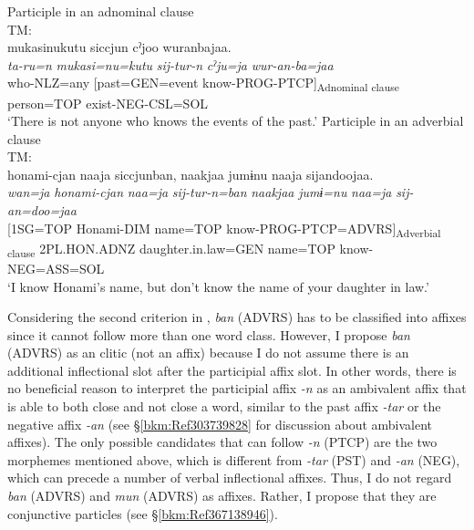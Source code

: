 \ea
\ea\label{ex:4.20a}Participle in an adnominal clause\hfill\relax[Co: 110328\_00.txt]\\
 {TM:} \\   {mukasinukutu}  {siccjun} {cˀjoo}  {wuranbajaa.}\\
   {\itshape ta-ru=n}  {\itshape mukasi=nu=kutu}  {\itshape sij-tur-n} {\itshape cˀju=ja}  {\itshape wur-an-ba=jaa}\\
   {who-NLZ=any}  {[past=GEN=event}  {know-PROG-PTCP]\textsubscript{Adnominal clause}} {person=TOP}  {exist-NEG-CSL=SOL}\\
   \glt ‘There is not anyone who knows the events of the past.’
\ex\label{ex:4.20b}Participle in an adverbial clause\hfill\relax[Co: 110328\_00.txt]\\
 {TM:} \\   {honami-{\textbar}cjan{\textbar}}  {naaja}  {siccjunban,} {naakjaa}  {jumɨnu}  {naaja}  {sijandoojaa.}\\
   {\itshape wan=ja}  {\textit{honami-cjan}}  {\itshape naa=ja}  {\itshape sij-tur-n=ban} {\itshape naakjaa}  {\itshape jumɨ=nu}  {\itshape naa=ja}  {\itshape sij-an=doo=jaa}\\
   {[1SG=TOP}  {Honami-DIM}  {name=TOP}  {know-PROG-PTCP=ADVRS]\textsubscript{Adverbial clause}} {2PL.HON.ADNZ}  {daughter.in.law=GEN}  {name=TOP}  {know-NEG=ASS=SOL}\\
   \glt ‘I know Honami’s name, but don’t know the name of your daughter in law.’\\
\z
\z

\noindent Considering the second criterion in , \textit{ban} (ADVRS) has to be classified into affixes since it cannot follow more than one word class. However, I propose \textit{ban} (ADVRS) as an clitic (not an affix) because I do not assume there is an additional inflectional slot after the participial affix slot. In other words, there is no beneficial reason to interpret the participial affix \textit{{}-n} as an ambivalent affix that is able to both close and not close a word, similar to the past affix \textit{{}-tar} or the negative affix \textit{{}-an} (see §\ref{bkm:Ref303739828} for discussion about ambivalent affixes). The only possible candidates that can follow \textit{{}-n} (PTCP) are the two morphemes mentioned above, which is different from \textit{{}-tar} (PST) and \textit{{}-an} (NEG), which can precede a number of verbal inflectional affixes. Thus, I do not regard \textit{ban} (ADVRS) and \textit{mun} (ADVRS) as affixes. Rather, I propose that they are conjunctive particles (see §\ref{bkm:Ref367138946}).

